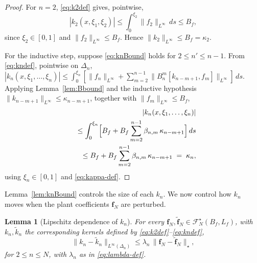 \documentclass[twocolumn,amsthm]{autart}
\newcommand{\Linf}{L^\infty}
\theoremstyle{plain}
\newtheorem{lemma}{Lemma}
\theoremstyle{definition}
\begin{document}
\begin{proof}
For $n=2$, \eqref{eq:k2def} gives, pointwise,
\begin{equation}
|k_2(x,\xi_1,\xi_2)| \le \int_0^{\xi_2} \|f_2\|_{\Linf}\,ds \le B_f,
\label{eq:k2-pw}
\end{equation}
since $\xi_2\in[0,1]$ and $\|f_2\|_{\Linf}\le B_f$. Hence $\|k_2\|_{\Linf}\le B_f = \kappa_2$.

For the inductive step, suppose \eqref{eq:knBound} holds for $2\le n'\le n-1$. From \eqref{eq:kndef}, pointwise on $\Delta_n$, $|k_n(x,\xi_1,\ldots,\xi_n)| \le \int_0^{\xi_n} [\|f_n\|_{\Linf} + \sum_{m=2}^{n-1} \|B_n^m[k_{n-m+1},f_m]\|_{\Linf}]\,ds$. Applying Lemma~\ref{lem:Bbound} and the inductive hypothesis $\|k_{n-m+1}\|_{\Linf}\le\kappa_{n-m+1}$, together with $\|f_m\|_{\Linf}\le B_f$,
\begin{eqnarray}
&& |k_n(x,\xi_1,\ldots,\xi_n)| \nonumber \\
&& \le \int_0^{\xi_n}\Bigl[B_f + B_f\sum_{m=2}^{n-1} \beta_{n,m}\,\kappa_{n-m+1}\Bigr]\,ds \nonumber \\
&& \le B_f + B_f\sum_{m=2}^{n-1} \beta_{n,m}\,\kappa_{n-m+1}
\;=\; \kappa_n,
\label{eq:kn-pw-2}
\end{eqnarray}
using $\xi_n\in[0,1]$ and \eqref{eq:kappa-def}.
\end{proof}

Lemma~\ref{lem:knBound} controls the size of each $k_n$. We now control how $k_n$ moves when the plant coefficients $\mathbf{f}_N$ are perturbed.

\begin{lemma}[Lipschitz dependence of $k_n$]
\label{lem:knLip}
For every $\mathbf{f}_N,\tilde{\mathbf{f}}_N\in\mathcal{F}_N^\star(B_f,L_f)$, with $k_n,\tilde k_n$ the corresponding kernels defined by \eqref{eq:k2def}--\eqref{eq:kndef},
\begin{equation}
\|k_n - \tilde k_n\|_{\Linf(\Delta_n)}
\le \lambda_n\,\|\mathbf{f}_N-\tilde{\mathbf{f}}_N\|_\star,
\label{eq:knLip}
\end{equation}
for $2\le n\le N$, with $\lambda_n$ as in \eqref{eq:lambda-def}.
\end{lemma}
\end{document}
